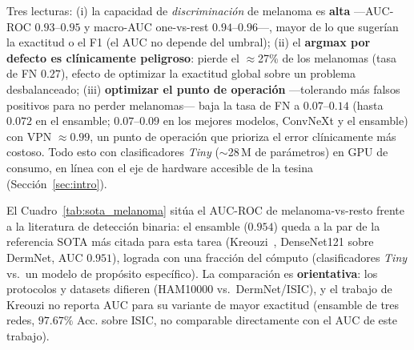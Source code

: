 \documentclass[11pt, a4paper]{article}
\begin{document}
Tres lecturas: (i) la capacidad de \emph{discriminación} de melanoma es \textbf{alta} —AUC-ROC
$0.93$--$0.95$ y macro-AUC one-vs-rest $0.94$--$0.96$—, mayor de lo que sugerían la exactitud o el F1
(el AUC no depende del umbral); (ii) el \textbf{argmax por defecto es clínicamente peligroso}: pierde el
$\approx$27\% de los melanomas (tasa de FN $0.27$), efecto de optimizar la exactitud global sobre un
problema desbalanceado; (iii) \textbf{optimizar el punto de operación} —tolerando más falsos positivos para
no perder melanomas— baja la tasa de FN a $\mathbf{0.07}$--$0.14$ (hasta $0.072$ en el ensamble;
$0.07$--$0.09$ en los mejores modelos, ConvNeXt y el ensamble) con VPN $\approx0.99$, un punto de
operación que prioriza el error clínicamente más costoso. Todo esto con clasificadores \emph{Tiny} ($\sim$28\,M de parámetros) en GPU de
consumo, en línea con el eje de hardware accesible de la tesina (Sección~\ref{sec:intro}).

El Cuadro~\ref{tab:sota_melanoma} sitúa el AUC-ROC de melanoma-vs-resto frente a la literatura de detección
binaria: el ensamble ($0.954$) queda a la par de la referencia SOTA más citada para esta tarea
(Kreouzi~\cite{Kreouzi2024}, DenseNet121 sobre DermNet, AUC $0.951$), lograda con una fracción del cómputo
(clasificadores \emph{Tiny} vs.\ un modelo de propósito específico). La comparación es \textbf{orientativa}:
los protocolos y datasets difieren (HAM10000 vs.\ DermNet/ISIC), y el trabajo de Kreouzi no reporta AUC para
su variante de mayor exactitud (ensamble de tres redes, $97.67\%$ Acc. sobre ISIC, no comparable
directamente con el AUC de este trabajo).
\end{document}
